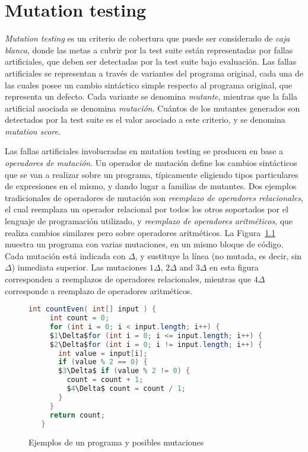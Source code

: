 \chapter[Mutation]{Mutation testing}
\label{cap:preliminares.mutation}

\emph{Mutation testing} es un criterio de cobertura que puede ser considerado de \emph{caja blanca}, donde las metas a cubrir por la test suite est\'an representadas por fallas artificiales, que deben ser detectadas por la test suite bajo evaluaci\'on. Las fallas artificiales se representan a trav\'es de variantes del programa original, cada una de las cuales posee un cambio sint\'actico simple respecto al programa original, que representa un defecto. Cada variante se denomina \emph{mutante}, mientras que la falla artificial asociada se denomina \emph{mutaci\'on}. Cu\'antos de los mutantes generados son detectados por la test suite es el valor asociado a este criterio, y se denomina \emph{mutation score}.

Las fallas artificiales involucradas en mutation testing se producen en base a \emph{operadores de mutaci\'on}. Un operador de mutaci\'on define los cambios sint\'acticos que se van a realizar sobre un programa, t\'ipicamente eligiendo tipos particulares de expresiones en el mismo, y dando lugar a familias de mutantes. Dos ejemplos tradicionales de operadores de mutaci\'on son \emph{reemplazo de operadores relacionales}, el cual reemplaza un operador relacional por todos los otros soportados por el lenguaje de programaci\'on utilizado, y \emph{reemplazo de operadores aritm\'eticos}, que realiza cambios similares pero sobre operadores aritm\'eticos. La Figura~\ref{figures.examples.mutations} muestra un programa con varias mutaciones, en un mismo bloque de c\'odigo. Cada mutaci\'on est\'a indicada con $\Delta$, y sustituye la l\'inea (no mutada, es decir, sin $\Delta$) inmediata superior. Las mutaciones $1\Delta$, $2\Delta$ and $3\Delta$ en esta figura corresponden a reemplazos de operadores relacionales, mientras que $4\Delta$ corresponde a reemplazo de operadores aritm\'eticos.

\begin{figure}[t]
	\begin{lstlisting}[frame=tlrb, mathescape=true,language=Java,basicstyle={},xleftmargin=.011\textwidth,xrightmargin=.011\textwidth]
   int countEven( int[] input ) {
     int count = 0;
     for (int i = 0; i < input.length; i++) {
     $1\Delta$for (int i = 0; i <= input.length; i++) {
     $2\Delta$for (int i = 0; i != input.length; i++) {
       int value = input[i];
       if (value % 2 == 0) {
       $3\Delta$ if (value % 2 != 0) {
         count = count + 1;
         $4\Delta$ count = count / 1;
       }
     }
     return count;
   }
	\end{lstlisting}
	\caption{Ejemplos de un programa y posibles mutaciones}
	\label{figures.examples.mutations}
\end{figure}

